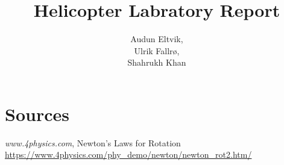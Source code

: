 \documentclass[11pt,a4paper]{article}
\author{    Audun Eltvik,\\
            Ulrik Fallrø, \\
            Shahrukh Khan }
\title{Helicopter Labratory Report}
\begin{document}
\maketitle
\newpage
\tableofcontents

\newpage


\newpage


\newpage


\newpage


\newpage
{}
\section*{Sources}
\begin{thebibliography}{1}
	\emph{www.4physics.com}, Newton's Laws for Rotation\\
	\url{https://www.4physics.com/phy_demo/newton/newton_rot2.htm/}
\end{thebibliography}
\end{document}
